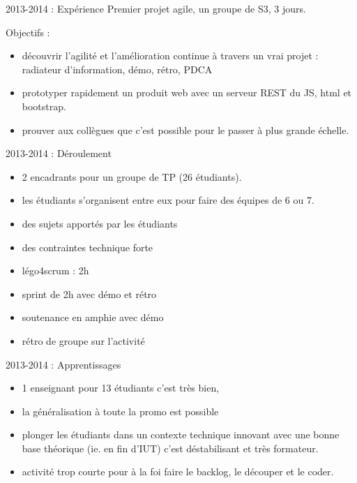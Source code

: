 \documentclass{beamer}
\begin{document}
\begin{frame}{2013-2014 : Expérience}
  Premier projet agile, un groupe de S3, 3 jours.

  Objectifs : 
  \begin{itemize}
    \item découvrir l'agilité et l'amélioration continue à travers un vrai projet : radiateur d'information, démo, rétro, PDCA
    \item prototyper rapidement un produit web avec un serveur REST du JS, html et bootstrap.
    \item prouver aux collègues que c'est possible pour le passer à plus grande échelle. 
  \end{itemize}
\end{frame}

\begin{frame}{2013-2014 : Déroulement}
  \begin{itemize}
    \item 2 encadrants pour un groupe de TP (26 étudiants).
    \item les étudiants s'organisent entre eux pour faire des équipes de 6 ou 7.
    \item des sujets apportés par les étudiants
    \item des contraintes technique forte
    \item légo4scrum : 2h
    \item sprint de 2h avec démo et rétro
    \item soutenance en amphie avec démo
    \item rétro de groupe sur l'activité
  \end{itemize}
\end{frame}

\begin{frame}{2013-2014 : Apprentissages}
  \begin{itemize}
    \item 1 enseignant pour 13 étudiants c'est très bien,
    \item la généralisation à toute la promo est possible
    \item plonger les étudiants dans un contexte technique innovant avec une bonne base théorique (ie. en fin d'IUT) c'est déstabilisant et très formateur. 
    \item activité trop courte pour à la foi faire le backlog, le découper et le coder.
  \end{itemize}
\end{frame}
\end{document}
